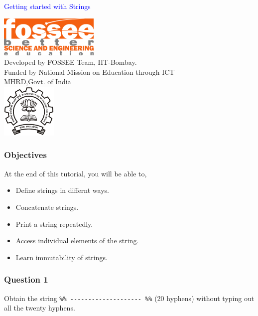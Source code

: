 \documentclass[presentation]{beamer}
\title{}
\author{FOSSEE}
\date{}
\begin{document}
\begin{frame}

\begin{center}
\vspace{12pt}
\textcolor{blue}{\huge Getting started with Strings}
\end{center}
\vspace{18pt}
\begin{center}
\vspace{10pt}
\includegraphics[scale=0.95]{../images/fossee-logo.png}\\
\vspace{5pt}
\scriptsize Developed by FOSSEE Team, IIT-Bombay. \\ 
\scriptsize Funded by National Mission on Education through ICT\\
\scriptsize  MHRD,Govt. of India\\
\includegraphics[scale=0.30]{../images/iitb-logo.png}\\
\end{center}
\end{frame}
\begin{frame}
\frametitle{Objectives}
\label{sec-2}

  At the end of this tutorial, you will be able to, 

\begin{itemize}
\item Define strings in differnt ways.
\item Concatenate strings.
\item Print a string repeatedly.
\item Access individual elements of the string.
\item Learn immutability of strings.
\end{itemize}
\end{frame}
\begin{frame}
\frametitle{Question 1}
\label{sec-3}

  Obtain the string \verb~%% -------------------- %%~ (20 hyphens) without
  typing out all the twenty hyphens.
\end{frame}
\end{document}
